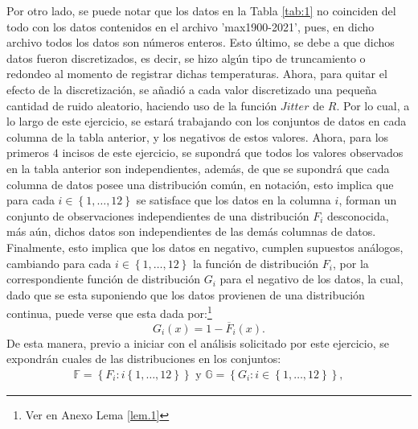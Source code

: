 \documentclass[10.5pt,notitlepage]{article}
\newcommand{\kis}[1]{\left\{ #1 \right\}}
\theoremstyle{plain}
\begin{document}
Por otro lado, se puede notar que los datos en la Tabla \ref{tab:1} no coinciden del todo con los datos contenidos en el archivo 'max1900-2021', pues, en dicho archivo todos los datos son números enteros. Esto último, se debe a que dichos datos fueron discretizados, es decir, se hizo algún tipo de truncamiento o redondeo al momento de registrar dichas temperaturas. Ahora, para quitar el efecto de la discretización, se añadió a cada valor discretizado una pequeña cantidad de ruido aleatorio, haciendo uso de la función \(Jitter\) de \(R\). Por lo cual, a lo largo de este ejercicio, se estará trabajando con los conjuntos de datos en cada columna de la tabla anterior, y los negativos de estos valores. Ahora, para los primeros \(4\) incisos de este ejercicio, se supondrá que todos los valores observados en la tabla anterior son independientes, además, de que se supondrá que cada columna de datos posee una distribución común, en notación, esto implica que para cada \(i \in \kis{1, \hdots, 12}\) se satisface que los datos en la columna \(i\), forman un conjunto de observaciones independientes de una distribución \(F_{i}\) desconocida, más aún, dichos datos son independientes de las demás columnas de datos. Finalmente, esto implica que los datos en negativo, cumplen supuestos análogos, cambiando para cada \(i \in \kis{1 , \hdots,12}\) la función de distribución \(F_{i}\), por la correspondiente función de distribución \(G_i\) para el negativo de los datos, la cual, dado que se esta suponiendo que los datos provienen de una distribución continua, puede verse que esta dada por:\footnote{Ver en Anexo Lema \ref{lem.1}}
\[
G_{i}(x) = 1-\overline{F}_{i}(x).
\]
De esta manera, previo a iniciar con el análisis solicitado por este ejercicio, se expondrán cuales de las distribuciones en los conjuntos:
\begin{align*}
    \mathbb{F} = \kis{F_{i}: i \kis{1, \hdots, 12}} \text{ y } \mathbb{G} = \kis{G_{i} : i \in \kis{1,\hdots, 12}},
\end{align*}
\end{document}
